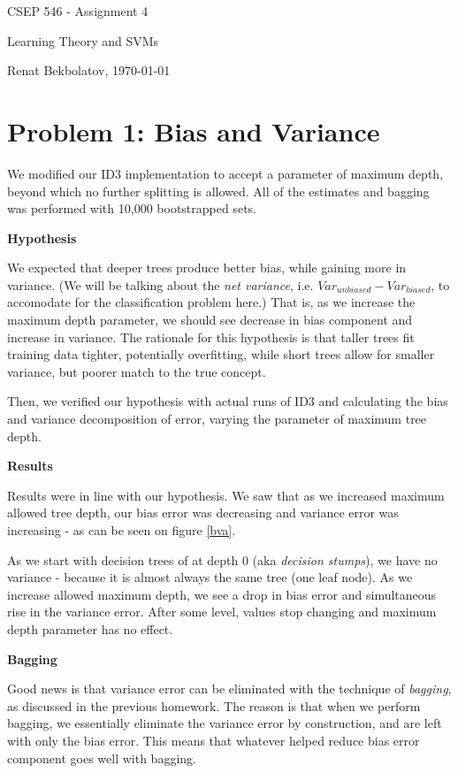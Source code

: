 \documentclass{article}
\begin{document}

\centerline{\sc \large CSEP 546 - Assignment 4}
\vspace{0.1pc}
\centerline{\sc Learning Theory and SVMs}
\centerline{\sc Renat Bekbolatov, \today }
\vspace{1.1pc}


\section*{Problem 1: Bias and Variance}

We modified our ID3 implementation to accept a parameter of maximum depth, beyond which no further splitting is allowed. All of the estimates and bagging was performed with 10,000 bootstrapped sets.

\textbf{Hypothesis}

We expected that deeper trees produce better bias, while gaining more in variance. (We will be talking about the \emph{net variance}, i.e. $Var_{unbiased} - Var_{biased}$, to accomodate for the classification problem here.) That is, as we increase the maximum depth parameter, we should see decrease in bias component and increase in variance.
The rationale for this hypothesis is that taller trees fit training data tighter, potentially overfitting, while short trees allow for smaller variance, but poorer match to the true concept.

Then, we verified our hypothesis with actual runs of ID3 and calculating the bias and variance decomposition of error, varying the parameter of maximum tree depth.

\textbf{Results}

Results were in line with our hypothesis. We saw that as we increased maximum allowed tree depth, our bias error was decreasing and variance error was increasing - as can be seen on figure \ref{bva}.

As we start with decision trees of at depth 0 (aka \emph{decision stumps}), we have no variance - because it is almost always the same tree (one leaf node). As we increase allowed maximum depth, we see a drop in bias error and simultaneous rise in the variance error. After some level, values stop changing and maximum depth parameter has no effect.

\textbf{Bagging}

Good news is that variance error can be eliminated with the technique of \emph{bagging}, as discussed in the previous homework. The reason is that when we perform bagging, we essentially eliminate the variance error by construction, and are left with only the bias error. This means that whatever helped reduce bias error component goes well with bagging.
\end{document}
